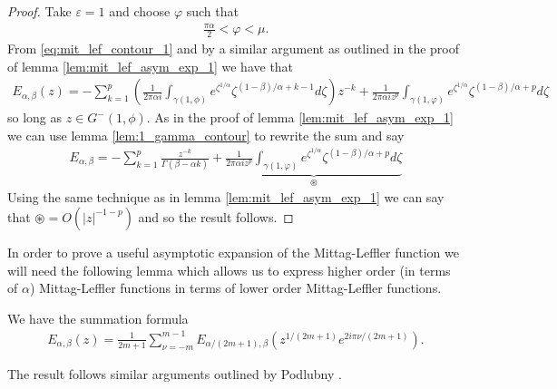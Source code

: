 \begin{proof}
    Take $ \varepsilon = 1 $ and choose $ \varphi $ such that
    \begin{align}
        \frac{\pi \alpha}{2} < \varphi < \mu.
    \end{align}
    From \eqref{eq:mit_lef_contour_1} and by a similar argument as outlined in the proof of lemma \ref{lem:mit_lef_asym_exp_1} we have that
    \begin{align}
        E_{\alpha, \beta}(z) = -\sum_{k=1}^{p} \left( \frac{1}{2\pi\alpha i} \int_{\gamma(1, \phi)} e^{\zeta^{1/\alpha}} \zeta^{(1-\beta)/\alpha + k - 1} d\zeta\right) z^{-k} + \frac{1}{2\pi \alpha i z^p} \int_{\gamma(1, \varphi)} e^{\zeta^{1/\alpha}} \zeta^{(1-\beta)/\alpha + p} d\zeta
    \end{align}
    so long as $ z \in G^-(1, \phi) $. As in the proof of lemma \ref{lem:mit_lef_asym_exp_1} we can use lemma \ref{lem:1_gamma_contour} to rewrite the sum and say
    \begin{align}
        E_{\alpha,\beta} = - \sum_{k=1}^p \frac{z^{-k}}{\Gamma(\beta - \alpha k)} + \underbrace{\frac{1}{2\pi \alpha i z^p} \int_{\gamma(1, \varphi)} e^{\zeta^{1/\alpha}} \zeta^{(1-\beta)/\alpha + p} d\zeta}_{\circledast}
    \end{align}
    Using the same technique as in lemma \ref{lem:mit_lef_asym_exp_1} we can say that $ \circledast = O(|z|^{-1-p}) $ and so the result follows.
\end{proof}
In order to prove a useful asymptotic expansion of the Mittag-Leffler function we will need the following lemma which allows us to express higher order (in terms of $ \alpha $) Mittag-Leffler functions in terms of lower order Mittag-Leffler functions. 
\begin{lemma}
    \label{lem:mit_lef_summation}
    We have the summation formula
    \begin{align}
        E_{\alpha, \beta}(z) = \frac{1}{2m+1} \sum_{\nu=-m}^{m-1} E_{\alpha / (2m+1), \beta}\left( z^{1/(2m+1)} e^{2i\pi\nu/(2m+1)}\right).
    \end{align}
\end{lemma}
The result follows similar arguments outlined by Podlubny \cite{Podlubny1999}.

